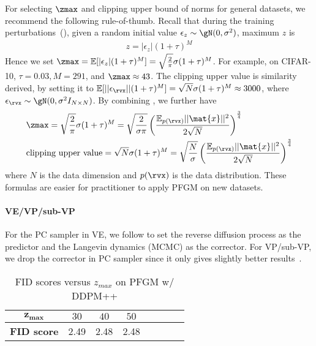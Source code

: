 For selecting $\zmax$ and clipping upper bound of norms for general datasets, we recommend the following rule-of-thumb. Recall that during the training perturbations~(), given a random initial value $\epsilon_z \sim \gN(0, \sigma^2)$, maximum $z$ is
\begin{align*}
     z=|\epsilon_z| (1+\tau)^M
\end{align*}
Hence we set $\zmax = \mathbb{E}[|\epsilon_z| (1+\tau)^M]=\sqrt{\frac{2}{\pi}}\sigma(1+\tau)^M$. For example, on CIFAR-10, $\tau=0.03, M=291$, and $\zmax\approx 43$. The clipping upper value is similarity derived, by setting it to $\mathbb{E}[||\epsilon_\rvx|| (1+\tau)^M] = \sqrt{N}\sigma (1+\tau)^M\approx 3000$, where $\epsilon_\rvx\sim \gN(0, \sigma^2I_{N\times N})$. By combining , we further have
\begin{align*}
    &\zmax = \sqrt{\frac{2}{\pi}}\sigma(1+\tau)^M = \sqrt{\frac{2}{\sigma\pi}}\left(\frac{\mathbb{E}_{p(\rvx)}||\mat{x}||^2}{2\sqrt{N}}\right)^{\frac34}\\
    &\textrm{clipping upper value}=\sqrt{N}\sigma (1+\tau)^M= \sqrt{\frac{N}{\sigma}}\left(\frac{\mathbb{E}_{p(\rvx)}||\mat{x}||^2}{2\sqrt{N}}\right)^{\frac34}
\end{align*}
where $N$ is the data dimension and $p(\rvx)$ is the data distribution. These formulas are easier for practitioner to apply PFGM on new datasets.



\paragraph{VE/VP/sub-VP} For the PC sampler in VE, we follow \cite{Song2021ScoreBasedGM} to set the reverse diffusion process as the predictor and the Langevin dynamics (MCMC) as the corrector. For VP/sub-VP, we drop the corrector in PC sampler since it only gives slightly better results~\cite{Song2021ScoreBasedGM}.
\begin{table*}[htb]
\begin{center}
\caption{FID scores versus $z_{max}$ on PFGM w/ DDPM++}
\label{table:fid-zmax}
\begin{tabular}{c c c c c c c c}
		\toprule
		\textbf{$\bm{z_{max}}$} &  $30$ &$40$ & $50$\\
		\midrule
        \textbf{FID score} & {2.49} & {2.48} &{2.48}\\
        \bottomrule
\end{tabular}
\end{center}
\end{table*}
